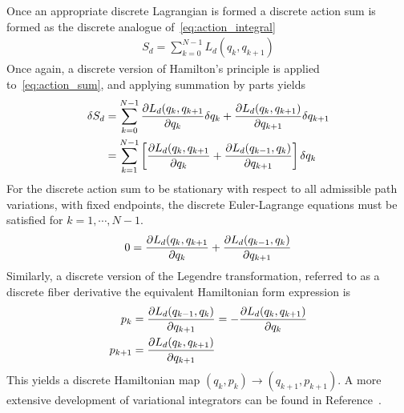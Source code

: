 \documentclass[letterpaper, preprint, paper,11pt]{AAS}	%
\begin{document}
Once an appropriate discrete Lagrangian is formed a discrete action sum is formed as the discrete analogue of~\cref{eq:action_integral}
\begin{align}\label{eq:action_sum}
	S_d = \sum_{k=0}^{N-1} L_d(q_k, q_{k+1})
\end{align}
Once again, a discrete version of Hamilton's principle is applied to~\cref{eq:action_sum}, and applying summation by parts yields
\begin{subequations}
\begin{align}\label{eq:dis_var_principle}
	\delta S_d &= \sum_{k=0}^{N-1} \deriv{L_d(q_k, q_{k+1}}{q_k} \delta q_k + \deriv{L_d(q_k, q_{k+1})}{q_{k+1}} \delta q_{k+1} \\
	&= \sum_{k=1}^{N-1} \bracket{ \deriv{L_d(q_k, q_{k+1}}{q_k} + \deriv{L_d(q_{k-1}, q_k)}{q_{k+1}}} \delta q_k
\end{align}
\end{subequations}
For the discrete action sum to be stationary with respect to all admissible path variations, with fixed endpoints, the discrete Euler-Lagrange equations must be satisfied for \( k = 1, \cdots, N-1 \).
\begin{align}\label{eq:discrete_euler-lagrange}
	0 = \deriv{L_d(q_k, q_{k+1}}{q_k} + \deriv{L_d(q_{k-1}, q_k)}{q_{k+1}}
\end{align}
Similarly, a discrete version of the Legendre transformation, referred to as a discrete fiber derivative the equivalent Hamiltonian form expression is
\begin{subequations}\label{eq:discrete_legendre}
\begin{align}
	p_k &= \frac{\partial L_d(q_{k-1},q_k)}{\partial q_{k+1}} = - \frac{\partial L_d(q_k, q_{k+1})}{\partial q_k} \\
	p_{k+1} &= \frac{\partial L_d(q_k, q_{k+1})}{\partial q_{k+1}}
\end{align}
\end{subequations}
This yields a discrete Hamiltonian map \( (q_k, p_k) \to (q_{k+1}, p_{k+1}) \).
A more extensive development of variational integrators can be found in Reference~.
\end{document}
